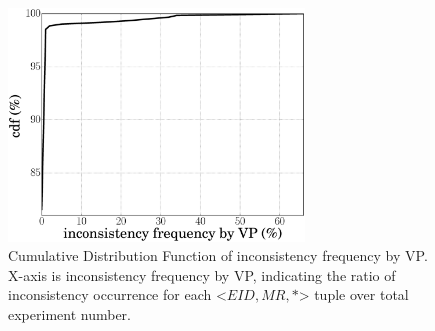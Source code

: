 \begin{figure}[!t]
	\centering
	\includegraphics[width=0.7\textwidth]{Pics/cdf_incons_occur_VP.eps}
	\caption{Cumulative Distribution Function of inconsistency frequency by VP. X-axis is inconsistency frequency by VP, indicating the ratio of inconsistency occurrence for each <$EID, MR, *$> tuple over total experiment number.}
	\label{fig:cdf_incons_occur_VP}
\end{figure}

